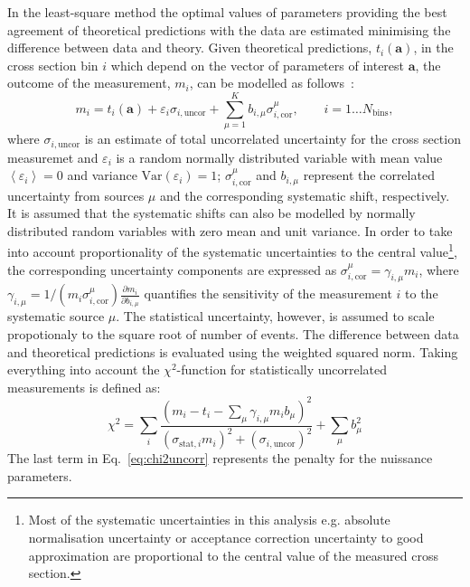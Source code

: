 In the least-square method the optimal values of parameters providing the best agreement of theoretical predictions with the data are estimated minimising the difference between data and theory. Given theoretical predictions, $t_i\left( \mathbf{a} \right)$, in the cross section bin $i$ which depend on the vector of parameters of interest $\mathbf{a}$, the outcome of the measurement, $m_i$, can be modelled as follows~\cite{Stump:2001gu,Botje:2001fx}:
\begin{equation}
 m_i = t_i\left( \mathbf{a} \right) + \varepsilon_{i} \sigma_{i,\text{uncor}} + \sum_{\mu=1}^{K}{b_{i,\mu}\sigma_{i,\text{cor}}^\mu}, \qquad i=1\ldots N_\text{bins},
\end{equation}
where $\sigma_{i,\text{uncor}}$ is an estimate of total uncorrelated uncertainty for the cross section measuremet and $\varepsilon_{i}$ is a random normally distributed variable with mean value $\left\langle \varepsilon_{i}\right\rangle = 0$ and variance $\text{Var}\left( \varepsilon_{i}\right) = 1$; $\sigma_{i,\text{cor}}^\mu$ and $b_{i,\mu}$ represent the correlated uncertainty from sources $\mu$ and the corresponding systematic shift, respectively. It is assumed that the systematic shifts can also be modelled by normally distributed random variables with zero mean and unit variance. In order to take into account proportionality of the systematic uncertainties to the central value\footnote{Most of the systematic uncertainties in this analysis e.g. absolute normalisation uncertainty or acceptance correction uncertainty to good approximation are proportional to the central value of the measured cross section.}, the corresponding uncertainty components are expressed as $\sigma_{i,\text{cor}}^\mu = \gamma_{i,\mu}m_i$, where $\gamma_{i,\mu}=1/\left( {m_i\sigma_{i,\text{cor}}^\mu}\right) \frac{\partial m_i}{\partial b_{i,\mu}}$ quantifies the sensitivity of the measurement $i$ to the systematic source $\mu$. The statistical uncertainty, however, is assumed to scale propotionaly to the square root of number of events. The difference between data and theoretical predictions is evaluated using the weighted squared norm. Taking everything into account the $\chi^2$-function for statistically uncorrelated measurements is defined as:
\begin{equation}
 \chi^2 = \sum_i{ \frac{\left( m_i-t_i-\sum_{\mu}{\gamma_{i,\mu} m_i b_\mu} \right)^2 }{ \left( \sigma_{\text{stat},i}m_i \right)^2 + \left( \sigma_{i,\text{uncor}}\right)^2 } } + \sum_{\mu}{b_\mu^2}
 \label{eq:chi2uncorr}
\end{equation}
The last term in Eq.~\eqref{eq:chi2uncorr} represents the penalty for the nuissance parameters. 

